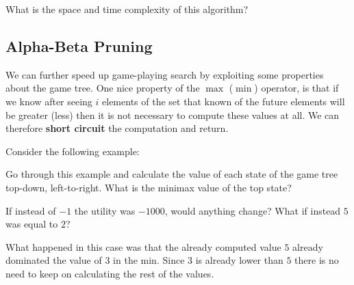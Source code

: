 \documentclass[11pt]{article}
\begin{document}
\begin{exercise}
  What is the space and time complexity of this algorithm?
\end{exercise}



\subsection{Alpha-Beta Pruning}

We can further speed up game-playing search by exploiting some properties about the game tree.  One nice property of the $\max$ ($\min$) operator, is that if we know after seeing $i$ elements of the set that known of the future elements will be greater (less) then it is not necessary to compute these values at all. We can therefore \textbf{short circuit} the computation and return.


Consider the following example:

\vspace{1cm}




  \begin{exercise}
    Go through this example and calculate the value of each state of the game tree top-down, left-to-right.
    What is the minimax value of the top state?
  \end{exercise}
\censor{}

  \begin{exercise}
    If instead of $-1$ the utility was $-1000$, would anything change? What if instead $5$ was equal to $2$?
  \end{exercise}
\censor{}

What happened in this case was that the already computed value $5$ already dominated the value of $3$ in the min. Since $3$ is already lower than $5$ there is no need to keep on calculating the rest of the values. 
\end{document}
